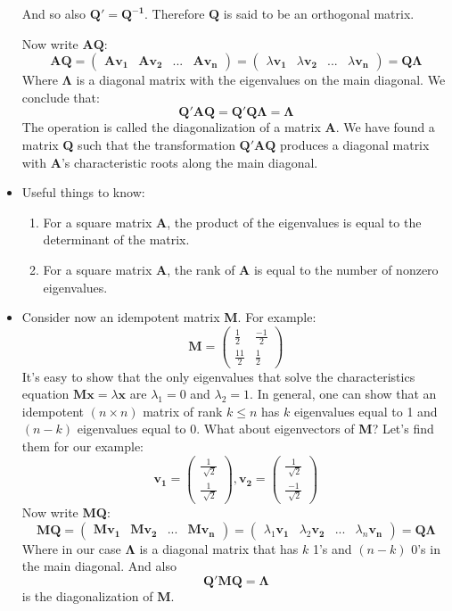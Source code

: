 \documentclass[11pt]{article}
\theoremstyle{definition}
\theoremstyle{remark}
\begin{document}
\begin{itemize}
And so also $\mathbf{Q' = Q^{-1}}$. Therefore $\mathbf{Q}$ is said to be an orthogonal matrix.

Now write $\mathbf{AQ}$:
$$
\mathbf{AQ} =
\begin{pmatrix}
\mathbf{Av_1}&\mathbf{Av_2}&...&\mathbf{Av_n}
\end{pmatrix}
=
\begin{pmatrix}
\lambda\mathbf{v_1}&\lambda\mathbf{v_2}&...&\lambda\mathbf{v_n}
\end{pmatrix}
= \mathbf{Q\Lambda}
$$
Where $\mathbf{\Lambda}$ is a diagonal matrix with the eigenvalues on the main diagonal. We conclude that:
$$
\mathbf{Q'AQ = Q'Q\Lambda = \Lambda}
$$
The operation is called the diagonalization of a matrix \textbf{A}. We have found a matrix \textbf{Q} such that the transformation $\mathbf{Q'AQ}$ produces a diagonal matrix with \textbf{A}'s characteristic roots along the main diagonal.
\item Useful things to know:
\begin{enumerate}
\item For a square matrix \textbf{A}, the product of the eigenvalues is equal to the determinant of the matrix.
\item For a square matrix \textbf{A}, the rank of \textbf{A} is equal to the number of nonzero eigenvalues. 
\end{enumerate}
\item Consider now an idempotent matrix \textbf{M}. For example:
$$
\mathbf{M} =
\begin{pmatrix}
\frac{1}{2}&\frac{-1}{2} \\ 
\frac{11}{2}&\frac{1}{2} 
\end{pmatrix}
$$
It's easy to show that the only eigenvalues that solve the characteristics equation $\mathbf{Mx} = \lambda\mathbf{x}$ are $\lambda_1 = 0$ and $\lambda_2 = 1$. In general, one can show that an idempotent $(n \times n)$ matrix of rank $k \leq n$ has $k$ eigenvalues equal to 1 and $(n-k)$ eigenvalues equal to 0. 
What about eigenvectors of \textbf{M}? 
\newline
Let's find them for our example:
$$
\mathbf{v_1} =
\begin{pmatrix}
\frac{1}{\sqrt[]{2}} \\
\frac{1}{\sqrt[]{2}}
\end{pmatrix}
,  
\mathbf{v_2} =
\begin{pmatrix}
\frac{1}{\sqrt[]{2}} \\
\frac{-1}{\sqrt[]{2}}
\end{pmatrix}
$$
Now write \textbf{MQ}:
$$
\mathbf{MQ} =
\begin{pmatrix}
\mathbf{Mv_1}&\mathbf{Mv_2}&...&\mathbf{Mv_n}
\end{pmatrix}
=
\begin{pmatrix}
\lambda_1\mathbf{v_1}&\lambda_2\mathbf{v_2}&...&\lambda_n\mathbf{v_n}
\end{pmatrix}
= \mathbf{Q\Lambda}
$$
Where in our case $\mathbf{\Lambda}$ is a diagonal matrix that has $k$ 1's and $(n-k)$ 0's in the main diagonal. And also 
$$
\mathbf{Q'MQ} = \mathbf{\Lambda}
$$
is the diagonalization of \textbf{M}.
\end{itemize}
\end{document}
